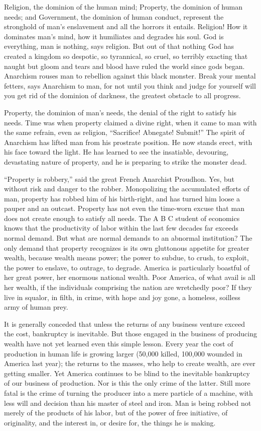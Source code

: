 Religion, the dominion of the human mind; Property, the dominion of
human needs; and Government, the dominion of human conduct, represent
the stronghold of man's enslavement and all the horrors it entails.
Religion! How it dominates man's mind, how it humiliates and degrades
his soul. God is everything, man is nothing, says religion. But out of
that nothing God has created a kingdom so despotic, so tyrannical, so
cruel, so terribly exacting that naught but gloom and tears and blood
have ruled the world since gods began. Anarchism rouses man to
rebellion against this black monster. Break your mental fetters, says
Anarchism to man, for not until you think and judge for yourself will
you get rid of the dominion of darkness, the greatest obstacle to all
progress.

Property, the dominion of man's needs, the denial of the right to
satisfy his needs. Time was when property claimed a divine right, when
it came to man with the same refrain, even as religion, ``Sacrifice!
Abnegate! Submit!'' The spirit of Anarchism has lifted man from his
prostrate position. He now stands erect, with his face toward the
light. He has learned to see the insatiable, devouring, devastating
nature of property, and he is preparing to strike the monster dead.

``Property is robbery,'' said the great French Anarchist Proudhon.
Yes, but without risk and danger to the robber. Monopolizing the
accumulated efforts of man, property has robbed him of his
birth-right, and has turned him loose a pauper and an
outcast. Property has not even the time-worn excuse that man does not
create enough to satisfy all needs. The A B C student of economics
knows that the productivity of labor within the last few decades far
exceeds normal demand. But what are normal demands to an abnormal
institution? The only demand that property recognizes is its own
gluttonous appetite for greater wealth, because wealth means power;
the power to subdue, to crush, to exploit, the power to enslave, to
outrage, to degrade. America is particularly boastful of her great
power, her enormous national wealth. Poor America, of what avail is
all her wealth, if the individuals comprising the nation are
wretchedly poor? If they live in squalor, in filth, in crime, with
hope and joy gone, a homeless, soilless army of human prey.

It is generally conceded that unless the returns of any business
venture exceed the cost, bankruptcy is inevitable. But those engaged
in the business of producing wealth have not yet learned even this
simple lesson. Every year the cost of production in human life is
growing larger (50,000 killed, 100,000 wounded in America last year);
the returns to the masses, who help to create wealth, are ever getting
smaller. Yet America continues to be blind to the inevitable
bankruptcy of our business of production. Nor is this the only crime
of the latter. Still more fatal is the crime of turning the producer
into a mere particle of a machine, with less will and decision than
his master of steel and iron. Man is being robbed not merely of the
products of his labor, but  of the power of free initiative,
of originality, and the interest in, or desire for, the things he is
making.

